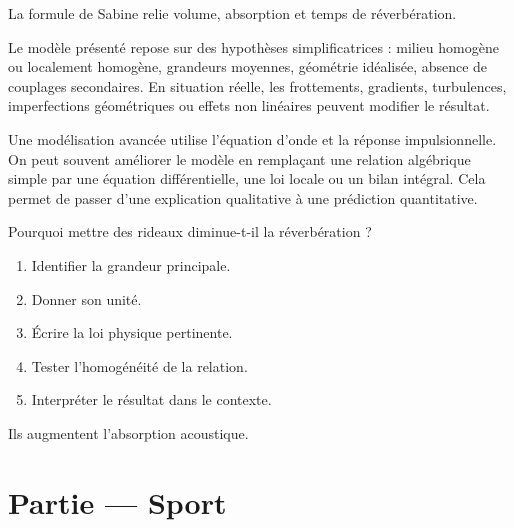 \documentclass[11pt,a4paper]{article}
\begin{document}
\begin{odgbox}
La formule de Sabine relie volume, absorption et temps de réverbération.
\end{odgbox}

\begin{attentionbox}
Le modèle présenté repose sur des hypothèses simplificatrices : milieu homogène ou localement homogène, grandeurs moyennes, géométrie idéalisée, absence de couplages secondaires. En situation réelle, les frottements, gradients, turbulences, imperfections géométriques ou effets non linéaires peuvent modifier le résultat.
\end{attentionbox}

\begin{approfondissementbox}
Une modélisation avancée utilise l'équation d'onde et la réponse impulsionnelle.
On peut souvent améliorer le modèle en remplaçant une relation algébrique simple par une équation différentielle, une loi locale ou un bilan intégral. Cela permet de passer d'une explication qualitative à une prédiction quantitative.
\end{approfondissementbox}

\begin{exercicebox}
Pourquoi mettre des rideaux diminue-t-il la réverbération ?
\begin{enumerate}
  \item Identifier la grandeur principale.
  \item Donner son unité.
  \item Écrire la loi physique pertinente.
  \item Tester l'homogénéité de la relation.
  \item Interpréter le résultat dans le contexte.
\end{enumerate}
\end{exercicebox}

\begin{corrigebox}[Indication]
Ils augmentent l'absorption acoustique.
\end{corrigebox}


\section{Partie — Sport}


\end{document}
